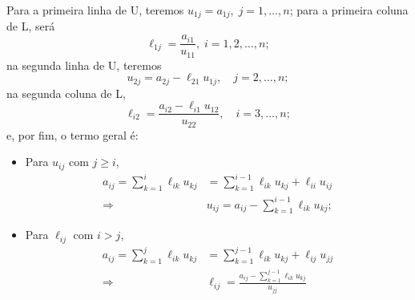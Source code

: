 \documentclass[../numerical_methods.tex]{subfiles}
\begin{document}

Para a primeira linha de U, teremos \(u_{1j}=a_{1j}, \; j=1, \dotsc , n\); para a primeira coluna de L, será
\[
	\ell_{1j} = \frac{a_{i1}}{u_{11}},\; i = 1, 2, \dotsc , n;
\]
na segunda linha de U, teremos
\[
	u_{2j} = a_{2j} - \ell_{21}u_{1j}, \quad j=2, \dotsc , n;
\]
na segunda coluna de L,
\[
	\ell_{i2} = \frac{a_{i2} - \ell_{i1}u_{12}}{u_{22}},\quad i=3, \dotsc , n;
\]
e, por fim, o termo geral é:
\begin{itemize}
	\item Para \(u_{ij}\) com \(j\geq i\),
	      \begin{align*}
		      a_{ij} = \sum\limits_{k=1}^{i}\ell_{ik}u_{kj} & = \sum\limits_{k=1}^{i-1}\ell_{ik}u_{kj}+\ell_{ii}u_{ij}          \\
		      \Rightarrow                                   & \boxed{u_{ij} = a_{ij} - \sum\limits_{k=1}^{i-1}\ell_{ik}u_{kj}};
	      \end{align*}
	\item Para \(\ell_{ij}\) com \(i > j\),
	      \begin{align*}
		      a_{ij} = \sum\limits_{k=1}^{j} \ell_{ik}u_{kj} & =\sum\limits_{k=1}^{j-1}\ell_{ik}u_{kj} + \ell_{ij}u_{jj}                        \\
		      \Rightarrow                                    & \boxed{\ell_{ij} = \frac{a_{ij}-\sum\limits_{k=1}^{j-1}\ell_{ik}u_{kj}}{u_{jj}}}
	      \end{align*}
\end{itemize}

\end{document}
